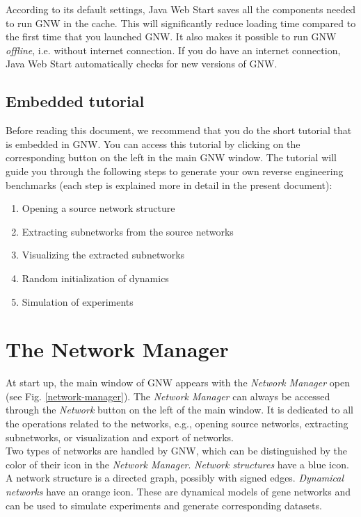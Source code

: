 \documentclass{llncs}
\newenvironment{myenum}{
\begin{enumerate}
}{\end{enumerate}}
\begin{document}
According to its default settings, Java Web Start saves all the components needed to run GNW in the cache. This will significantly reduce loading time compared to the first time that you launched GNW. It also makes it possible to run GNW \emph{offline}, i.e. without internet connection. If you do have an internet connection, Java Web Start automatically checks for new versions of GNW. 

\subsection{Embedded tutorial}

Before reading this document, we recommend that you do the short tutorial that is embedded in GNW. You can access this tutorial by clicking on the corresponding button on the left in the main GNW window. The tutorial will guide you through the following steps to generate your own reverse engineering benchmarks (each step is explained more in detail in the present document):

\begin{myenum}
 \item Opening a source network structure
 \item Extracting subnetworks from the source networks
 \item Visualizing the extracted subnetworks
 \item Random initialization of dynamics
 \item Simulation of experiments
\end{myenum}


\section{The Network Manager}

At start up, the main window of GNW appears with the \emph{Network Manager} open (see Fig. \ref{network-manager}). The \emph{Network Manager} can always be accessed through the \emph{Network} button on the left of the main window. It is dedicated to all the operations related to the networks, e.g., opening source networks, extracting subnetworks, or visualization and export of networks.\\

Two types of networks are handled by GNW, which can be distinguished by the color of their icon in the \emph{Network Manager}. \emph{Network structures} have a blue icon. A network structure is a directed graph, possibly with signed edges. \emph{Dynamical networks} have an orange icon. These are dynamical models of gene networks and can be used to simulate experiments and generate corresponding datasets.
\end{document}
